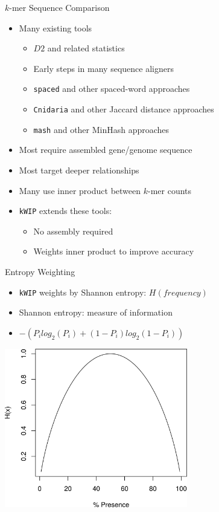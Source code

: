\documentclass[t]{beamer}
\begin{document}
\begin{frame}{$k$-mer Sequence Comparison}
  \begin{itemize}
    \item Many existing tools
    \begin{itemize}
      \item $D2$ and related statistics
      \item Early steps in many sequence aligners
      \item \texttt{spaced} and other spaced-word approaches
        \autocite{morgenstern_estimating_2015,leimeister_fast_2014}
      \item \texttt{Cnidaria} and other Jaccard distance approaches
        \autocite{aflitos_cnidaria:_2015}
      \item \texttt{mash} and other MinHash approaches
        \autocite{ondov_fast_2015}
    \end{itemize}
    \item Most require assembled gene/genome sequence
    \item Most target deeper relationships
    \item Many use inner product between $k$-mer counts
    \item \texttt{kWIP} extends these tools:
      \begin{itemize}
        \item No assembly required
        \item Weights inner product to improve accuracy
      \end{itemize}
  \end{itemize}
\end{frame}


\begin{frame}{Entropy Weighting}
  \begin{itemize}
    \item \texttt{kWIP} weights by Shannon entropy: $H(frequency)$
    \item Shannon entropy: measure of information
    \item $-(P_i log_2(P_i) + (1-P_i) log_2(1-P_i))$
  \end{itemize}
  \begin{center}
    \includegraphics[width=0.6\textwidth]{img/shanent.png}
  \end{center}
\end{frame}
\end{document}
